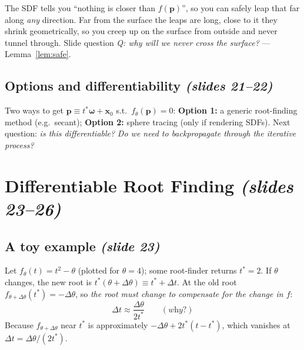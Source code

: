 \documentclass[11pt,a4paper]{article}
\newcommand{\bx}{\bm{x}}
\newcommand{\bp}{{\bm{p}}}
\newcommand{\bom}{{\bm{\omega}}}
\theoremstyle{definition}
\theoremstyle{plain}
\theoremstyle{remark}
\begin{document}
\begin{intuition}
The SDF tells you ``nothing is closer than $f(\bp)$'', so you can safely leap that far along \emph{any} direction. Far
from the surface the leaps are long, close to it they shrink geometrically, so you creep up on the surface from outside
and never tunnel through. Slide question \emph{Q: why will we never cross the surface?} --- Lemma~\ref{lem:safe}.
\end{intuition}

\subsection{Options and differentiability \emph{(slides 21--22)}}
Two ways to get $\bp\equiv t^*\bom+\bx_0$ s.t.\ $f_\theta(\bp)=0$: \textbf{Option 1:} a generic root-finding method
(e.g.\ secant); \textbf{Option 2:} sphere tracing (only if rendering SDFs). Next question: \emph{is this differentiable?}
\emph{Do we need to backpropagate through the iterative process?}

\section{Differentiable Root Finding \emph{(slides 23--26)}}
\subsection{A toy example \emph{(slide 23)}}
Let $f_\theta(t)=t^2-\theta$ (plotted for $\theta=4$); some root-finder returns $t^*=2$. If $\theta$ changes, the new
root is $t^*(\theta+\Delta\theta)\equiv t^*+\Delta t$. At the old root $f_{\theta+\Delta\theta}(t^*)=-\Delta\theta$, so
\emph{the root must change to compensate for the change in $f$}:
\[
\Delta t\approx\frac{\Delta\theta}{2t^*}\qquad(\textit{why?})
\]
Because $f_{\theta+\Delta\theta}$ near $t^*$ is approximately $-\Delta\theta+2t^*(t-t^*)$, which vanishes at $\Delta t=\Delta\theta/(2t^*)$.
\end{document}
